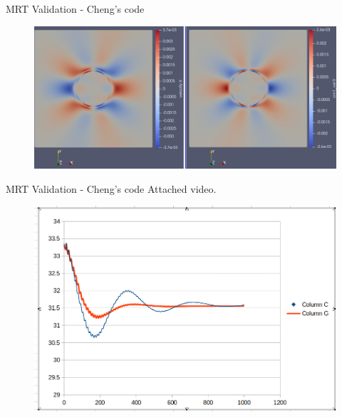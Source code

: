 \documentclass[8pt]{beamer}
\begin{document}
	
	\begin{frame}{MRT Validation - Cheng's code}
		\begin{figure}
			\centering
			\includegraphics[scale=0.25]{pics/MRT_StaticDroplet_VelField.png}
		\end{figure}
	\end{frame}
	\begin{frame}{MRT Validation - Cheng's code}
		Attached video.
		\begin{figure}
			\centering
			\includegraphics[scale=0.25]{pics/MRT_oscillatingAxis.png}
		\end{figure}
	\end{frame}
	
\end{document}
